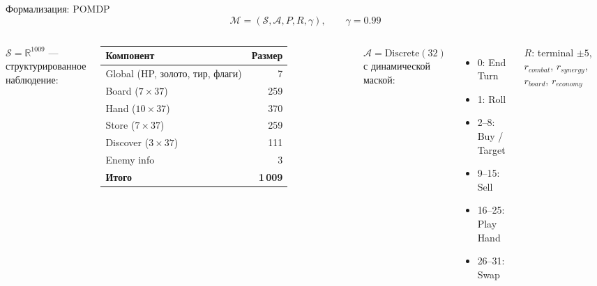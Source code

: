 \documentclass[aspectratio=169,10pt]{beamer}
\begin{document}
\begin{frame}{Формализация: POMDP}
  \[
    \mathcal{M} = (\mathcal{S}, \mathcal{A}, P, R, \gamma),\qquad \gamma = 0.99
  \]

  \begin{columns}[T]
    \textbf{$\mathcal{S} = \mathbb{R}^{1009}$} --- структурированное наблюдение:
    \vspace{0.2em}
    \small
    \begin{tabular}{lr}
      \toprule
      Компонент & Размер \\
      \midrule
      Global (HP, золото, тир, флаги) & 7 \\
      Board ($7 \times 37$) & 259 \\
      Hand ($10 \times 37$) & 370 \\
      Store ($7 \times 37$) & 259 \\
      Discover ($3 \times 37$) & 111 \\
      Enemy info & 3 \\
      \midrule
      \textbf{Итого} & \textbf{1\,009} \\
      \bottomrule
    \end{tabular}
    \normalsize

    \textbf{$\mathcal{A} = \text{Discrete}(32)$} с динамической маской:
    \vspace{0.2em}
    \begin{itemize}\small
      \item 0: End Turn
      \item 1: Roll
      \item 2--8: Buy / Target
      \item 9--15: Sell
      \item 16--25: Play Hand
      \item 26--31: Swap
    \end{itemize}

    \vspace{0.4em}
    \textbf{$R$}: terminal $\pm 5$, $r_{combat}$, $r_{synergy}$, $r_{board}$, $r_{economy}$
  \end{columns}
\end{frame}
\end{document}
